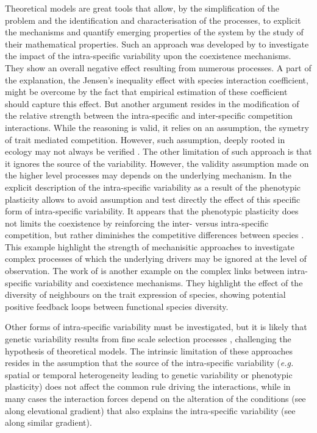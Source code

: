 Theoretical models are great tools that allow, by the simplification of the problem and the identification and characterisation of the processes, to explicit the mechanisms and quantify emerging properties of the system by the study of their mathematical properties. Such an approach was developed by \cite{hart_how_2016} to investigate the impact of the intra-specific variability upon the coexistence mechanisms. They show an overall negative effect resulting from numerous processes. A part of the explanation, the Jensen's inequality effect with species interaction coefficient, might be overcome by the fact that empirical estimation of these coefficient should capture this effect. But another argument resides in the modification of the relative strength between the intra-specific and inter-specific competition interactions. While the reasoning is valid, it relies on an assumption, the symetry of trait mediated competition. However, such assumption, deeply rooted in ecology \parencite{macarthur_limiting_1967} may not always be verified \parencite{kunstler_plant_2016}. The other limitation of such approach is that it ignores the source of the variability. However, the validity assumption made on the higher level processes may depends on the underlying mechanism. In \model the explicit description of the intra-specific variability as a result of the phenotypic plasticity allows to avoid assumption and test directly the effect of this specific form of intra-specific variability. It appears that the phenotypic plasticity does not limits the coexistence by reinforcing the inter- versus intra-specific competition, but rather diminishes the competitive differences between species . This example highlight the strength of mechanisitic approaches to investigate complex processes of which the underlying drivers may be ignored at the level of observation. The work of \cite{zuppinger-dingley_selection_2014} is another example on the complex links between intra-specific variability and coexistence mechanisms. They highlight the effect of the diversity of neighbours on the trait expression of species, showing potential positive feedback loops between functional species diversity.

Other forms of intra-specific variability must be investigated, but it is likely that genetic variability results from fine scale selection processes \cite{hamann_evidence_2016}, challenging the hypothesis of theoretical models. The intrinsic limitation of these approaches resides in the assumption that the source of the intra-specific variability (\textit{e.g.} spatial or temporal heterogeneity leading to genetic variability or phenotypic plasticity) does not affect the common rule driving the interactions, while in many cases the interaction forces depend on the alteration of the conditions (see \cite{choler_facilitation_2001} along elevational gradient) that also explains the intra-specific variability (see \cite{kichenin_contrasting_2013} along similar gradient).

